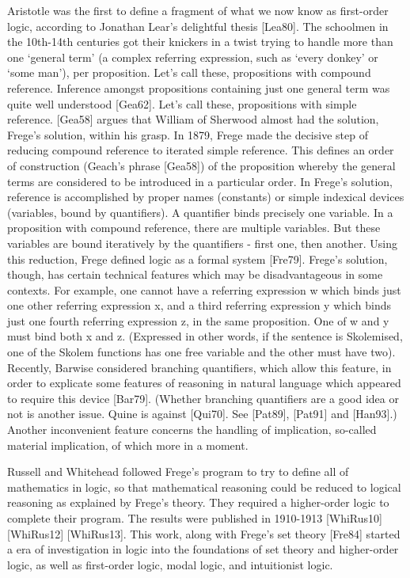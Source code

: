 \begin{spec}
Aristotle was the first to define a fragment of what we now know as
first-order logic, according to Jonathan Lear's delightful thesis
[Lea80].  The schoolmen in the 10th-14th centuries got their
knickers in a twist trying to handle more than one `general term' (a
complex referring expression, such as `every donkey' or `some man'),
per proposition. Let's call these, propositions with compound
reference.  Inference amongst propositions containing just one
general term was quite well understood [Gea62].  Let's call these,
propositions with simple reference.  [Gea58] argues that William of
Sherwood almost had the solution, Frege's solution, within his
grasp.  In 1879, Frege made the decisive step of reducing compound
reference to iterated simple reference. This defines an order of
construction (Geach's phrase [Gea58]) of the proposition whereby the
general terms are considered to be introduced in a particular order.
In Frege's solution, reference is accomplished by proper names
(constants) or simple indexical devices (variables, bound by
quantifiers). A quantifier binds precisely one variable. In a
proposition with compound reference, there are multiple variables.
But these variables are bound iteratively by the quantifiers - first
one, then another.  Using this reduction, Frege defined logic as a
formal system [Fre79].  Frege's solution, though, has certain
technical features which may be disadvantageous in some contexts.
For example, one cannot have a referring expression w which binds
just one other referring expression x, and a third referring
expression y which binds just one fourth referring expression z, in
the same proposition.  One of w and y must bind both x and z.
(Expressed in other words, if the sentence is Skolemised, one of the
Skolem functions has one free variable and the other must have two).
Recently, Barwise considered branching quantifiers, which allow this
feature, in order to explicate some features of reasoning in natural
language which appeared to require this device [Bar79].  (Whether
branching quantifiers are a good idea or not is another issue.
Quine is against [Qui70]. See [Pat89], [Pat91] and [Han93].)
Another inconvenient feature concerns the handling of implication,
so-called material implication, of which more in a moment.

Russell and Whitehead followed Frege's program to try to define all
of mathematics in logic, so that mathematical reasoning could be
reduced to logical reasoning as explained by Frege's theory. They
required a higher-order logic to complete their program. The results
were published in 1910-1913 [WhiRus10] [WhiRus12] [WhiRus13]. This
work, along with Frege's set theory [Fre84] started a era of
investigation in logic into the foundations of set theory and
higher-order logic, as well as first-order logic, modal logic, and
intuitionist logic.


\end{spec}
